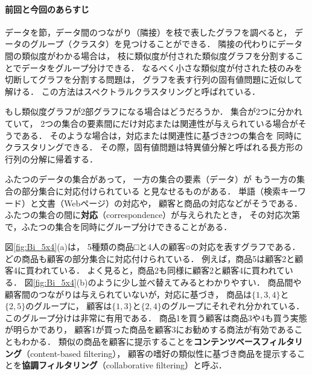 




\paragraph{前回と今回のあらすじ}
データを節，データ間のつながり（隣接）を枝で表したグラフを調べると，
データのグループ（クラスタ）を見つけることができる．
隣接の代わりにデータ間の類似度がわかる場合は，
枝に類似度が付された類似度グラフを分割することでデータをグループ分けできる．
なるべく小さな類似度が付された枝のみを切断してグラフを分割する問題は，
グラフを表す行列の固有値問題に近似して解ける．
この方法はスペクトラルクラスタリングと呼ばれている．

もし類似度グラフが2部グラフになる場合はどうだろうか．
集合が2つに分かれていて，
2つの集合の要素間にだけ対応または関連性が与えられている場合がそうである．
そのような場合は，対応または関連性に基づき2つの集合を
同時にクラスタリングできる．
その際，固有値問題は特異値分解と呼ばれる長方形の行列の分解に帰着する．



ふたつのデータの集合があって，
一方の集合の要素（データ）が
もう一方の集合の部分集合に対応付けられている
と見なせるものがある．
単語（検索キーワード）と文書（Webページ）の対応や，
顧客と商品の対応などがそうである．
ふたつの集合の間に{\bf 対応}（correspondence）が与えられたとき，
その対応次第で，ふたつの集合を同時にグループ分けできることがある．

図\ref{fig:Bi_5x4}(a)は，
5種類の商品□と4人の顧客○の対応を表すグラフである．
どの商品も顧客の部分集合に対応付けられている．
例えば，商品5は顧客2と顧客4に買われている．
よく見ると，商品2も同様に顧客2と顧客4に買われている．
図\ref{fig:Bi_5x4}(b)のように少し並べ替えてみるとわかりやすい．
商品間や顧客間のつながりは与えられていないが，対応に基づき，
商品は$\{1,3,4\}$と$\{2,5\}$のグループに，
顧客は$\{1,3\}$と$\{2,4\}$のグループにそれぞれ分かれている．
このグループ分けは非常に有用である．
商品1を買う顧客は商品3や4も買う実態が明らかであり，
顧客1が買った商品を顧客3にお勧めする商法が有効であることもわかる．
類似の商品を顧客に提示することを{\bf コンテンツベースフィルタリング}（content-based filtering），
顧客の嗜好の類似性に基づき商品を提示することを{\bf 協調フィルタリング}（collaborative filtering）と呼ぶ．

